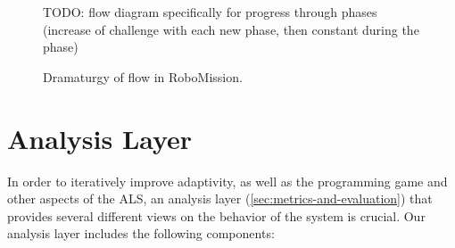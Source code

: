 \begin{figure}[htb]
\centering
TODO: flow diagram specifically for progress through phases
(increase of challenge with each new phase, then constant during the phase)
\caption{Dramaturgy of flow in RoboMission.}
\label{fig:robomission.flow}
\end{figure}






\section{Analysis Layer}
\label{sec:robomission.analysis-layer}

In order to iteratively improve adaptivity, as well as the programming game
and other aspects of the ALS,
an analysis layer (\cref{sec:metrics-and-evaluation})
that provides several different views on the behavior of the system
is crucial.
Our analysis layer includes the following components:



